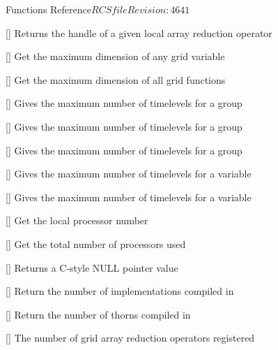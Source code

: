 \begin{cactuspart}{ Functions Reference}{$RCSfile$}{$Revision: 4641 $}
\begin{Lentry}
\item[\code{CCTK\_LocalArrayReductionHandle}] [\pageref{CCTK-LocalArrayReductionHandle}]
  Returns the handle of a given local array reduction operator

\item[\code{CCTK\_MaxDim}] [\pageref{CCTK-MaxDim}]
  Get the maximum dimension of any grid variable

\item[\code{CCTK\_MaxGFDim}] [\pageref{CCTK-MaxGFDim}]
  Get the maximum dimension of all grid functions

\item[\code{CCTK\_MaxTimeLevels}] [\pageref{CCTK-MaxTimeLevels}]
  Gives the maximum number of timelevels for a group

\item[\code{CCTK\_MaxTimeLevelsGI}] [\pageref{CCTK-MaxTimeLevelsGI}]
  Gives the maximum number of timelevels for a group

\item[\code{CCTK\_MaxTimeLevelsGN}] [\pageref{CCTK-MaxTimeLevelsGN}]
  Gives the maximum number of timelevels for a group

\item[\code{CCTK\_MaxTimeLevelsVI}] [\pageref{CCTK-MaxTimeLevelsVI}]
  Gives the maximum number of timelevels for a variable

\item[\code{CCTK\_MaxTimeLevelsVN}] [\pageref{CCTK-MaxTimeLevelsVN}]
  Gives the maximum number of timelevels for a variable

\item[\code{CCTK\_MyProc}] [\pageref{CCTK-MyProc}]
  Get the local processor number

\item[\code{CCTK\_nProcs}] [\pageref{CCTK-nProcs}]
  Get the total number of processors used

\item[\code{CCTK\_NullPointer}] [\pageref{CCTK-NullPointer}]
  Returns a C-style NULL pointer value

\item[\code{CCTK\_NumCompiledImplementations}]
  [\pageref{CCTK-NumCompiledImplementations}]
  Return the number of implementations compiled in

\item[\code{CCTK\_NumCompiledThorns}] [\pageref{CCTK-NumCompiledThorns}]
  Return the number of thorns compiled in

\item[\code{CCTK\_NumGridArrayReductionOperators}] [\pageref{CCTK-NumGridArrayReductionOperators}]
  The number of grid array reduction operators registered


\end{Lentry}
\end{cactuspart}

